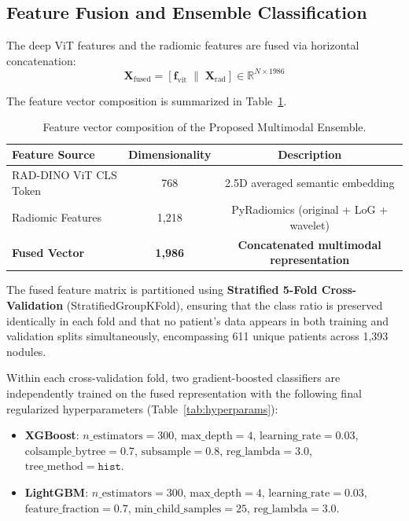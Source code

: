 \documentclass{iopjournal}
\begin{document}
\subsection{Feature Fusion and Ensemble Classification}

The deep ViT features and the radiomic features are fused via horizontal
concatenation:
\[
\mathbf{X}_{\mathrm{fused}} = [\mathbf{f}_{\mathrm{vit}}\;\|\;
\mathbf{X}_{\mathrm{rad}}]\in\mathbb{R}^{N\times1986}
\]

The feature vector composition is summarized in Table~\ref{tab:features}.

\begin{table}[h]
\centering
\caption{Feature vector composition of the Proposed Multimodal
Ensemble.}\label{tab:features}
\begin{tabular}{lcc}
\toprule
\textbf{Feature Source} & \textbf{Dimensionality} & \textbf{Description} \\
\midrule
RAD-DINO ViT CLS Token & 768 & 2.5D averaged semantic embedding \\
Radiomic Features & 1,218 & PyRadiomics (original + LoG + wavelet) \\
\midrule
\textbf{Fused Vector} & \textbf{1,986} & \textbf{Concatenated multimodal
representation} \\
\bottomrule
\end{tabular}
\end{table}

The fused feature matrix is partitioned using \textbf{Stratified 5-Fold
Cross-Validation} (StratifiedGroupKFold), ensuring that the class ratio is
preserved identically in each fold and that no patient's data appears in both
training and validation splits simultaneously, encompassing 611 unique patients
across 1,393 nodules.

Within each cross-validation fold, two gradient-boosted classifiers are
independently trained on the fused representation with the following final
regularized hyperparameters (Table~\ref{tab:hyperparams}):
\begin{itemize}
  \item \textbf{XGBoost}: $n\_\mathrm{estimators}=300$,
        $\mathrm{max\_depth}=4$, $\mathrm{learning\_rate}=0.03$,
        $\mathrm{colsample\_bytree}=0.7$, $\mathrm{subsample}=0.8$,
        $\mathrm{reg\_lambda}=3.0$, $\mathrm{tree\_method}=\texttt{hist}$.
  \item \textbf{LightGBM}: $n\_\mathrm{estimators}=300$,
        $\mathrm{max\_depth}=4$, $\mathrm{learning\_rate}=0.03$,
        $\mathrm{feature\_fraction}=0.7$, $\mathrm{min\_child\_samples}=25$,
        $\mathrm{reg\_lambda}=3.0$.
\end{itemize}
\end{document}
